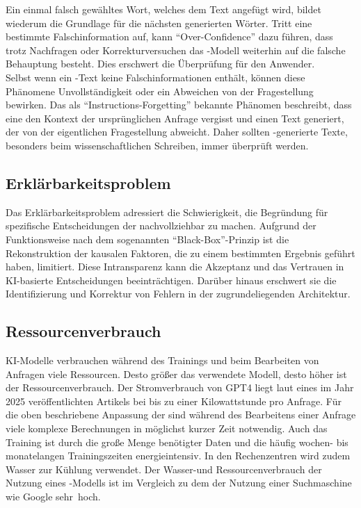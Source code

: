 \documentclass[../main.tex]{subfiles}
\begin{document}
Ein einmal falsch gewähltes Wort, welches dem Text angefügt wird, bildet wiederum die Grundlage für die nächsten generierten Wörter. Tritt eine bestimmte Falschinformation auf, 
kann "`Over-Confidence"' dazu führen, dass trotz Nachfragen oder Korrekturversuchen das -Modell weiterhin auf die falsche Behauptung besteht. Dies erschwert die 
Überprüfung für den Anwender. \cite{allgemHalluzinationen,softmax} \\
Selbst wenn ein -Text keine Falschinformationen enthält, können diese Phänomene Unvollständigkeit oder ein Abweichen von der Fragestellung bewirken. Das als 
"`Instructions-Forgetting"' bekannte Phänomen beschreibt, dass eine  den Kontext der ursprünglichen Anfrage vergisst und einen Text generiert, der von der 
eigentlichen Fragestellung abweicht. Daher sollten -generierte Texte, besonders beim wissenschaftlichen Schreiben, immer überprüft werden. \cite{allgemHalluzinationen}


\subsection{Erklärbarkeitsproblem}
\label{sec:erklärbarkeitsproblem}

Das Erklärbarkeitsproblem adressiert die Schwierigkeit, die Begründung für spezifische Entscheidungen der  nachvollziehbar zu machen. Aufgrund der Funktionsweise nach dem sogenannten 
"`Black-Box"'-Prinzip ist die Rekonstruktion der kausalen Faktoren, die zu einem bestimmten Ergebnis geführt haben, limitiert. Diese Intransparenz kann die Akzeptanz und das Vertrauen in 
KI-basierte Entscheidungen beeinträchtigen. Darüber hinaus erschwert sie die Identifizierung und Korrektur von Fehlern in der zugrundeliegenden Architektur. \cite{explainable}
 

\subsection{Ressourcenverbrauch}

KI-Modelle verbrauchen während des Trainings und beim Bearbeiten von Anfragen viele Ressourcen. Desto größer das verwendete Modell, desto höher ist der Ressourcenverbrauch. 
Der Stromverbrauch von GPT4 liegt laut eines im Jahr 2025 veröffentlichten Artikels bei bis zu einer Kilowattstunde pro Anfrage\cite{Energieverbrauch}. Für die oben beschriebene Anpassung der  sind während des Bearbeitens einer Anfrage viele 
komplexe Berechnungen in möglichst kurzer Zeit notwendig. Auch das Training ist durch die große Menge benötigter Daten und die häufig wochen- bis monatelangen Trainingszeiten 
energieintensiv. In den Rechenzentren wird zudem Wasser zur Kühlung verwendet. Der Wasser-und Ressourcenverbrauch der Nutzung eines -Modells ist im Vergleich zu dem der Nutzung einer 
Suchmaschine wie Google \mbox{sehr hoch\cite{KINachhaltigkeit}.} 
\end{document}
